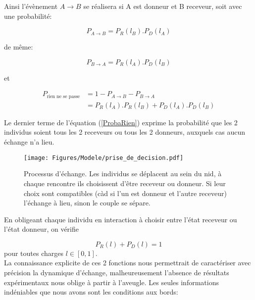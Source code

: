 Ainsi l'évènement $A \rightarrow B$ se réalisera si A est donneur et B receveur, soit avec une probabilité:

\begin{equation}
P_{A \rightarrow B} = P_R(l_B) . P_D(l_A)
\label{ProbaAdonneB}
\end{equation}

de même:

\begin{equation}
P_{B \rightarrow A} = P_R(l_A) . P_D(l_B)
\label{ProbaBdonneA}
\end{equation}

et 

\begin{equation}
\begin{aligned}
P_{\text{rien ne se passe}} &= 1- P_{A \rightarrow B} - P_{B \rightarrow A}\\
&= P_R(l_A) . P_R(l_B) + P_D(l_A) . P_D(l_B)
\end{aligned}
\label{ProbaRien}
\end{equation}

Le dernier terme de l'équation (\ref{ProbaRien}) exprime la probabilité que les 2 individus soient tous les 2 receveurs ou tous les 2 donneurs, auxquels cas aucun échange n'a lieu.\\

\begin{figure}[h]
\centering
\texttt{[image: Figures/Modele/prise\_de\_decision.pdf]}
\caption{Processus d'échange. Les individus se déplacent au sein du nid, à chaque rencontre ils choisissent d'être receveur ou donneur. Si leur choix sont compatibles (càd si l'un est donneur et l'autre receveur) l'échange à lieu, sinon le couple se sépare.}
\label{trophallaxie}
\end{figure}

En obligeant chaque individu en interaction à choisir entre l'état receveur ou l'état donneur, on vérifie

\begin{equation}
P_R(l)+P_D(l) = 1
\label{PRPD1}
\end{equation}
pour toutes charges $l\in[0,1]$.\\

La connaissance explicite de ces 2 fonctions nous permettrait de caractériser avec précision la dynamique d'échange, malheureusement l'absence de résultats expérimentaux nous oblige à partir à l'aveugle. Les seules informations indéniables que nous avons sont les conditions aux bords:

